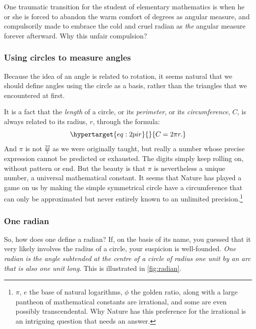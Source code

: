 \documentclass[
  a4paper,
]{article}
\begin{document}
One traumatic transition for the student of elementary mathematics is
when he or she is forced to abandon the warm comfort of degrees as
angular measure, and compulsorily made to embrace the cold and cruel
radian as \emph{the} angular measure forever afterward. Why this unfair
compulsion?

\hypertarget{using-circles-to-measure-angles}{%
\subsubsection{Using circles to measure
angles}\label{using-circles-to-measure-angles}}

Because the idea of an angle is related to rotation, it seems natural
that we should define angles using the circle as a basis, rather than
the triangles that we encountered at first.

It is a fact that the \emph{length} of a circle, or its
\emph{perimeter}, or its \emph{circumference}, \(C\), is always related
to its radius, \(r\), through the formula:
\begin{equation}\protect\hypertarget{eq:2pir}{}{
C = 2\pi r.
}\label{eq:2pir}\end{equation} And \(\pi\) is not \(\frac{22}{7}\) as we
were originally taught, but really a number whose precise expression
cannot be predicted or exhausted. The digits simply keep rolling on,
without pattern or end. But the beauty is that \(\pi\) is nevertheless a
unique number, a universal mathematical constant. It seems that Nature
has played a game on us by making the simple symmetrical circle have a
circumference that can only be approximated but never entirely known to
an unlimited precision.\footnote{\(\pi\), \(e\) the base of natural
  logarithms, \(\phi\) the golden ratio, along with a large pantheon of
  mathematical constants are irrational, and some are even possibly
  transcendental. Why Nature has this preference for the irrational is
  an intriguing question that needs an answer.}

\hypertarget{one-radian}{%
\subsubsection{One radian}\label{one-radian}}

So, how does one define a radian? If, on the basis of its name, you
guessed that it very likely involves the radius of a circle, your
suspicion is well-founded. \emph{One radian is the angle subtended at
the centre of a circle of radius one unit by an arc that is also one
unit long}. This is illustrated in \cref{fig:radian}.
\end{document}
